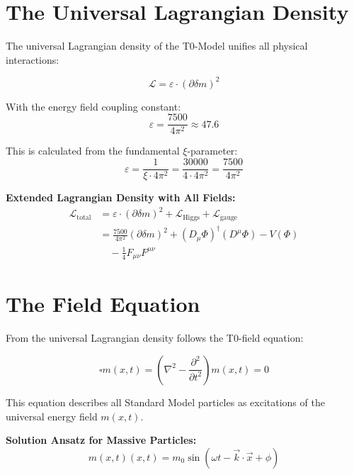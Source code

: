 \documentclass[12pt,a4paper]{report}
\newcommand{\mfield}{m(x,t)}  %
\newcommand{\xipar}{\xi}      %
\begin{document}
\section{The Universal Lagrangian Density}\label{sec:universal_lagrangian}

The universal Lagrangian density of the T0-Model unifies all physical interactions:

\begin{equation}\label{eq:universal_lagrangian_density}
	\mathcal{L} = \varepsilon \cdot (\partial \delta m)^2
\end{equation}

With the energy field coupling constant:
\begin{equation}
	\varepsilon = \frac{7500}{4\pi^2} \approx 47.6
\end{equation}

This is calculated from the fundamental $\xipar$-parameter:
\begin{equation}
	\varepsilon = \frac{1}{\xipar \cdot 4\pi^2} = \frac{30000}{4 \cdot 4\pi^2} = \frac{7500}{4\pi^2}
\end{equation}

\textbf{Extended Lagrangian Density with All Fields:}
\begin{align}
	\mathcal{L}_{\text{total}} &= \varepsilon \cdot (\partial \delta m)^2 + \mathcal{L}_{\text{Higgs}} + \mathcal{L}_{\text{gauge}} \\
	&= \frac{7500}{4\pi^2} (\partial \delta m)^2 + (D_\mu \Phi)^\dagger (D^\mu \Phi) - V(\Phi) \\
	&\quad - \frac{1}{4} F_{\mu\nu} F^{\mu\nu}
\end{align}

\section{The Field Equation}\label{sec:field_equation}

From the universal Lagrangian density follows the T0-field equation:

\begin{equation}\label{eq:dalembert_massfield}
	\square \mfield = \left(\nabla^2 - \frac{\partial^2}{\partial t^2}\right) \mfield = 0
\end{equation}

This equation describes all Standard Model particles as excitations of the universal energy field $\mfield$.

\textbf{Solution Ansatz for Massive Particles:}
\begin{equation}
	\mfield(x,t) = m_0 \sin(\omega t - \vec{k} \cdot \vec{x} + \phi)
\end{equation}
\end{document}
